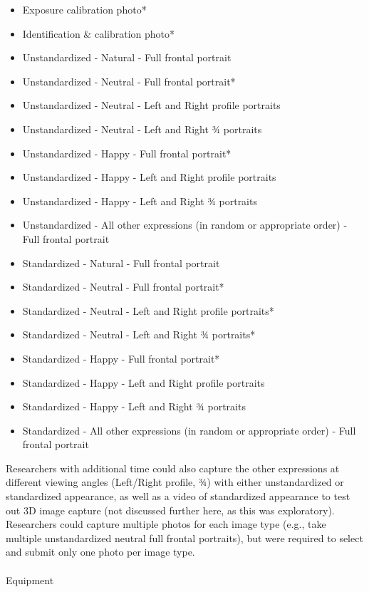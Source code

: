 \documentclass[
  letterpaper,
  DIV=11,
  numbers=noendperiod]{scrartcl}
\makeatletter
\let\oldparagraph\paragraph
\renewcommand{\paragraph}{
    \@ifstar
      \xxxParagraphStar
      \xxxParagraphNoStar
  }
\newcommand{\xxxParagraphStar}[1]{\oldparagraph*{#1}\mbox{}}
\newcommand{\xxxParagraphNoStar}[1]{\oldparagraph{#1}\mbox{}}
\providecommand{\tightlist}{%
  \setlength{\itemsep}{0pt}\setlength{\parskip}{0pt}}
\makeatother
\begin{document}
\begin{itemize}
\tightlist
\item
  Exposure calibration photo*
\item
  Identification \& calibration photo*
\item
  Unstandardized - Natural - Full frontal portrait
\item
  Unstandardized - Neutral - Full frontal portrait*
\item
  Unstandardized - Neutral - Left and Right profile portraits
\item
  Unstandardized - Neutral - Left and Right ¾ portraits
\item
  Unstandardized - Happy - Full frontal portrait*
\item
  Unstandardized - Happy - Left and Right profile portraits
\item
  Unstandardized - Happy - Left and Right ¾ portraits
\item
  Unstandardized - All other expressions (in random or appropriate
  order) - Full frontal portrait
\item
  Standardized - Natural - Full frontal portrait
\item
  Standardized - Neutral - Full frontal portrait*
\item
  Standardized - Neutral - Left and Right profile portraits*
\item
  Standardized - Neutral - Left and Right ¾ portraits*
\item
  Standardized - Happy - Full frontal portrait*
\item
  Standardized - Happy - Left and Right profile portraits
\item
  Standardized - Happy - Left and Right ¾ portraits
\item
  Standardized - All other expressions (in random or appropriate order)
  - Full frontal portrait
\end{itemize}

Researchers with additional time could also capture the other
expressions at different viewing angles (Left/Right profile, ¾) with
either unstandardized or standardized appearance, as well as a video of
standardized appearance to test out 3D image capture (not discussed
further here, as this was exploratory). Researchers could capture
multiple photos for each image type (e.g., take multiple unstandardized
neutral full frontal portraits), but were required to select and submit
only one photo per image type.

\paragraph{Equipment}\label{equipment}
\end{document}
